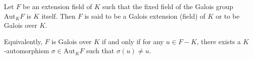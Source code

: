 Let $F$ be an extension field of $K$ such that the fixed field of the Galois group $\mathrm{Aut}_K F$ is $K$ itself. Then $F$ is said to be a Galois extension (field) of $K$ or to be Galois over $K$.

Equivalently, $F$ is Galois over $K$ if and only if for any $u \in F - K$, there exists a $K$-automorphism $\sigma \in \mathrm{Aut}_K F$ such that $\sigma(u) \neq u$.
